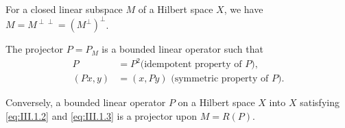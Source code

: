 \begin{corollaryu} For a closed linear subspace $M$ of a Hilbert space $X$, we have $M = M^{\perp \perp} = (M^{\perp})^{\perp}$. 
\end{corollaryu}

\begin{theorem}\label{thm:III.1.Theorem.2} The projector $P = P_{M}$ is a bounded linear operator such that 
\begin{align}
P& = P ^{2} \text{(idempotent property of } P), \label{eq:III.1.2} \\
(P x, y)& = (x, P y) \text{ (symmetric property of } P). \label{eq:III.1.3}
\end{align}
\end{theorem}

Conversely, a bounded linear operator $P$ on a Hilbert space $X$ into $X$ satisfying \eqref{eq:III.1.2} and \eqref{eq:III.1.3} is a projector upon $M = R(P)$. 

